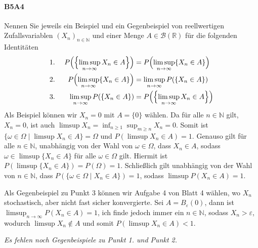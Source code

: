 \documentclass{article}
\begin{document}
\paragraph{B5A4}
Nennen Sie jeweils ein Beispiel und ein Gegenbeispiel von reellwertigen Zufallsvariablen $(X_n)_{n\in\mathbb{N}}$ und einer Menge $A\in\mathcal{B}(\mathbb{R})$ für die folgenden Identitäten
  \begin{alignat*}{2}
&\text{1.~}&P\Bigl(\Bigl\{\limsup_{n\to\infty}X_n\in A\Bigr\}\Bigr)&=P\Bigl(\limsup_{n\to\infty}\{X_n\in A\}\Bigr)\\
&\text{2.~}&P\Bigl(\limsup_{n\to\infty}\{X_n\in A\}\Bigr)&=\limsup_{n\to\infty}P(\{X_n\in A\})\\
&\text{3.~}&\limsup_{n\to\infty}P(\{X_n\in A\})&=P\Bigl(\Bigl\{\limsup_{n\to\infty}X_n\in A\Bigr\}\Bigr)
\end{alignat*}
Als Beispiel können wir $X_n=0$ mit $A=\{0\}$ wählen.
Da für alle $n\in\mathbb{N}$ gilt, $X_n=0$, ist auch $\limsup X_n=\inf_{n\geq1}\sup_{m\geq n} X_n=0$.
Somit ist $\{\omega\in\Omega\mid\limsup X_n\in A\}=\Omega$ und $P(\limsup X_n\in A)=1$.
Genauso gilt für alle $n\in\mathbb{N}$, unabhängig von der Wahl von $\omega\in\Omega$, dass $X_n\in A$, sodass $\omega\in\limsup\{ X_n\in A\}$ für alle $\omega\in\Omega$ gilt.
Hiermit ist $P(\limsup\{X_n\in A\})=P(\Omega)=1$.
Schließlich gilt unabhängig von der Wahl von $n\in\mathbb{N}$, dass $P(\{\omega\in\Omega\mid X_n\in A\})=1$, sodass
$\limsup P(X_n\in A)=1$.

Als Gegenbeispiel zu Punkt 3 können wir Aufgabe 4 von Blatt 4 wählen, wo $X_n$ stochastisch, aber nicht fast sicher konvergierte.
Sei $A=B_\varepsilon(0)$, dann ist $\limsup_{n\to\infty}P(X_n\in A)=1$, ich finde jedoch immer ein $n\in\mathbb{N}$, sodass $X_n>\varepsilon$, wodurch $\limsup X_n\notin A$ und somit $P(\limsup X_n\in A)<1$.

\emph{Es fehlen noch Gegenbeispiele zu Punkt 1. und Punkt 2.}
\newpage
\end{document}
